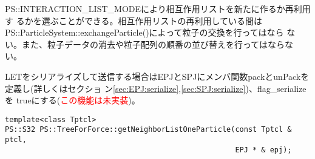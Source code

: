 \begin{itemize}
PS::INTERACTION\_LIST\_MODEにより相互作用リストを新たに作るか再利用す
るかを選ぶことができる。相互作用リストの再利用している間は
PS::ParticleSystem::exchangeParticle()によって粒子の交換を行ってはなら
ない。また、粒子データの消去や粒子配列の順番の並び替えを行ってはならな
い。

LETをシリアライズして送信する場合はEPJとSPJにメンバ関数packとunPackを
定義し(詳しくはセクショ
ン\ref{sec:EPJ:serialize},\ref{sec:SPJ:serialize})、flag\_serializeを
trueにする(\textcolor{red}{この機能は未実装})。

\end{itemize}

\label{sec:neighborlist}

\begin{screen}
\begin{verbatim}
template<class Tptcl>
PS::S32 PS::TreeForForce::getNeighborListOneParticle(const Tptcl & ptcl, 
                                                     EPJ * & epj);
\end{verbatim}
\end{screen}

